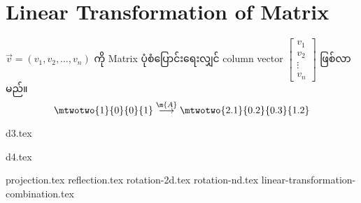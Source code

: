 \section{Linear Transformation of Matrix}
$\vec{v}=(v_1,v_2,\dots,v_n)$ ကို Matrix ပုံစံပြောင်းရေးလျှင် column vector $\begin{bmatrix}
    v_1 \\ v_2 \\ \vdots \\ v_n
\end{bmatrix}$ ဖြစ်လာမည်။ 
\[
    \mtwotwo{1}{0}{0}{1}\stackrel{\m{A}}{\longrightarrow}\mtwotwo{2.1}{0.2}{0.3}{1.2}
\]
\begin{minipage}{0.45\textwidth}
    \centering
    {d3.tex}
\end{minipage}
\hfill
\begin{minipage}{0.45\textwidth}
    \centering
    {d4.tex}
\end{minipage}
{projection.tex}
{reflection.tex}
{rotation-2d.tex}
{rotation-nd.tex}
{linear-transformation-combination.tex}